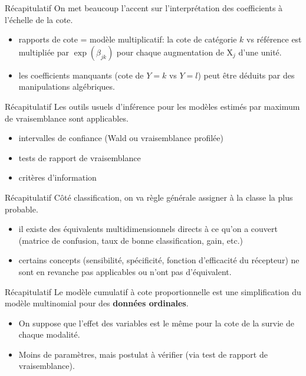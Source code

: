 \documentclass[
  ignorenonframetext,
]{beamer}
\providecommand{\tightlist}{%
  \setlength{\itemsep}{0pt}\setlength{\parskip}{0pt}}\usepackage{longtable,booktabs,array}
\begin{document}
\begin{frame}{Récapitulatif}
\protect\hypertarget{ruxe9capitulatif-3}{}
On met beaucoup l'accent sur l'interprétation des coefficients à
l'échelle de la cote.

\begin{itemize}
\tightlist
\item
  rapports de cote = modèle multiplicatif: la cote de catégorie \(k\) vs
  référence est multipliée par \(\exp(\beta_{jk})\) pour chaque
  augmentation de \(\mathrm{X}_j\) d'une unité.
\item
  les coefficients manquants (cote de \(Y=k\) vs \(Y=l\)) peut être
  déduits par des manipulations algébriques.
\end{itemize}
\end{frame}

\begin{frame}{Récapitulatif}
\protect\hypertarget{ruxe9capitulatif-4}{}
Les outils usuels d'inférence pour les modèles estimés par maximum de
vraisemblance sont applicables.

\begin{itemize}
\tightlist
\item
  intervalles de confiance (Wald ou vraisemblance profilée)
\item
  tests de rapport de vraisemblance
\item
  critères d'information
\end{itemize}
\end{frame}

\begin{frame}{Récapitulatif}
\protect\hypertarget{ruxe9capitulatif-5}{}
Côté classification, on va règle générale assigner à la classe la plus
probable.

\begin{itemize}
\tightlist
\item
  il existe des équivalents multidimensionnels directs à ce qu'on a
  couvert (matrice de confusion, taux de bonne classification, gain,
  etc.)
\item
  certains concepts (sensibilité, spécificité, fonction d'efficacité du
  récepteur) ne sont en revanche pas applicables ou n'ont pas
  d'équivalent.
\end{itemize}
\end{frame}

\begin{frame}{Récapitulatif}
\protect\hypertarget{ruxe9capitulatif-6}{}
Le modèle cumulatif à cote proportionnelle est une simplification du
modèle multinomial pour des \textbf{données ordinales}.

\begin{itemize}
\tightlist
\item
  On suppose que l'effet des variables est le même pour la cote de la
  survie de chaque modalité.
\item
  Moins de paramètres, mais postulat à vérifier (via test de rapport de
  vraisemblance).
\end{itemize}
\end{frame}
\end{document}
